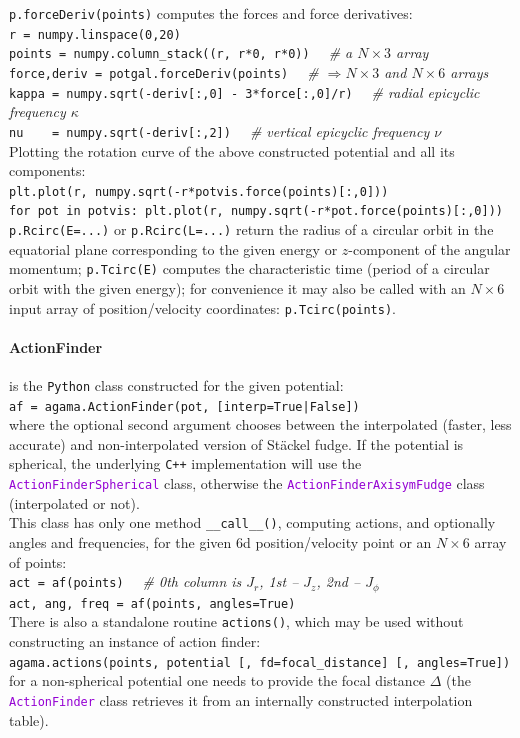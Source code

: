 \documentclass[12pt]{article}
\newcommand{\Cpp}  {\texttt{C++}\xspace}
\newcommand{\Python}{\texttt{Python}\xspace}
\newcommand{\ttt}[1]{\textcolor{darkviolet}{\texttt{#1}}}
\begin{document}
\texttt{p.forceDeriv(points)} computes the forces and force derivatives:\\
\texttt{r = numpy.linspace(0,20)}\\
\texttt{points = numpy.column_stack((r, r*0, r*0))}
\textit{\color{Sepia} \ \ \# a $N\times3$ array}\\
\texttt{force,deriv = potgal.forceDeriv(points)}
\textit{\color{Sepia} \ \ \# $\Rightarrow N\times3$ and $N\times6$ arrays} \\
\texttt{kappa = numpy.sqrt(-deriv[:,0] - 3*force[:,0]/r)}
\textit{\color{Sepia} \ \ \# radial epicyclic frequency $\kappa$} \\
\texttt{nu~~~~= numpy.sqrt(-deriv[:,2])}
\textit{\color{Sepia} \ \ \# vertical epicyclic frequency $\nu$} \\[2mm]
Plotting the rotation curve of the above constructed potential and all its components:\\
\texttt{plt.plot(r, numpy.sqrt(-r*potvis.force(points)[:,0]))}\\
\texttt{for pot in potvis: plt.plot(r, numpy.sqrt(-r*pot.force(points)[:,0]))}\\[2mm]
\texttt{p.Rcirc(E=...)} or \texttt{p.Rcirc(L=...)} return the radius of a circular orbit in the equatorial plane corresponding to the given energy or $z$-component of the angular momentum;
\texttt{p.Tcirc(E)} computes the characteristic time (period of a circular orbit with the given energy); for convenience it may also be called with an $N\times6$ input array of position/velocity coordinates: \texttt{p.Tcirc(points)}.

\paragraph{ActionFinder} is the \Python class constructed for the given potential:\\
\texttt{af = agama.ActionFinder(pot, [interp=True|False])}\\
where the optional second argument chooses between the interpolated (faster, less accurate) and non-interpolated version of St\"ackel fudge. If the potential is spherical, the underlying \Cpp implementation will use the \ttt{ActionFinderSpherical} class, otherwise the \ttt{ActionFinderAxisymFudge} class (interpolated or not).\\
This class has only one method \texttt{__call__()}, computing actions, and optionally angles and frequencies, for the given 6d position/velocity point or an $N\times6$ array of points:\\
\texttt{act = af(points)}
\textit{\color{Sepia}\ \ \# 0th column is $J_r$, 1st -- $J_z$, 2nd -- $J_\phi$} \\
\texttt{act, ang, freq = af(points, angles=True)}\\[2mm]
There is also a standalone routine \texttt{actions()}, which may be used without constructing an instance of action finder:\\
\texttt{agama.actions(points, potential [, fd=focal_distance] [, angles=True])}\\
for a non-spherical potential one needs to provide the focal distance $\Delta$ (the \ttt{ActionFinder} class retrieves it from an internally constructed interpolation table).
\end{document}
